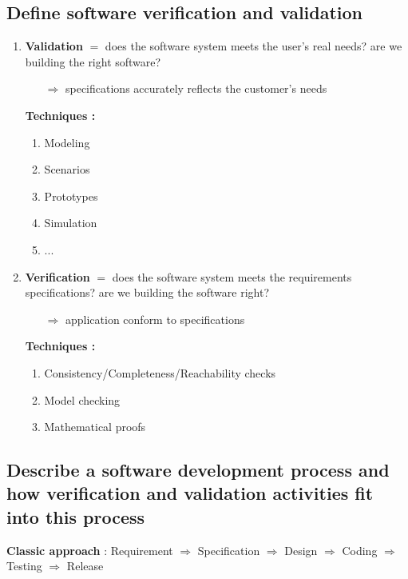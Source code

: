 \documentclass{article}
\begin{document}
\subsection{Define software verification and validation}
\vspace{-0.5cm}
\begin{multicols}{2}
\begin{enumerate}
\item \textbf{Validation} $=$ does
the
software
system
meets
the
user's
real
needs? are
we building
the
right
software?
\begin{itemize}
    \item [$\Rightarrow$] specifications
accurately
reflects
the
customer's
needs\\
\end{itemize}
\textbf{Techniques : }
\begin{enumerate}
    \item Modeling
    \item Scenarios
    \item Prototypes
    \item Simulation
    \item  ...
\end{enumerate}
\vfill\null
\columnbreak
\item \textbf{Verification} $=$ does
the
software
system
meets
the
requirements
specifications? are
we building
the
software
right?
\begin{itemize}
    \item [$\Rightarrow$] application
conform
to
specifications\\
\end{itemize}
\textbf{Techniques : }
\begin{enumerate}
    \item Consistency/Completeness/Reachability checks 
    \item Model
checking
    \item Mathematical
proofs
\end{enumerate}
\end{enumerate}
\vfill\null
\end{multicols}

\vspace{-0.8cm}
\subsection{Describe a software development process and how verification
and validation activities fit into this process}
\noindent \textbf{Classic approach} : Requirement $\Rightarrow$ Specification $\Rightarrow$  Design $\Rightarrow$ Coding $\Rightarrow$ Testing $\Rightarrow$ Release
\end{document}
